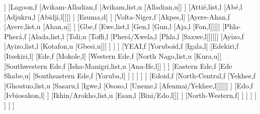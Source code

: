 \documentclass[landscape]{standalone}
\begin{document}
\begin{forest}
						[Agotime,l]
					]
					[Lagoon,f
						[Avikam-Alladian,f
							[Avikam,list,u
							[Alladian,u]]
						]
						[Attié,list,l
						[Abé,l
						[Adjukru,l
						[Abidji,l]]]]
					]
					[Esuma,d]
				]%
				[Volta-Niger,f
					[Akpes,l]
					[Ayere-Ahan,f
						[Ayere,list,u
						[Ahan,u]]
					]
					[Gbe,f
						[Ewe,list,l
						[Gen,l
						[Gun,l
						[Aja,l
						[Fon,l]]]]]
						[Phla-Pherá,f
							[Alada,list,l
							[Toli,u
							[Toffi,l
							[Pherá/Xwela,l
							[Phla,l
							[Saxwe,l]]]]]]
							[Ayizo,f
								[Ayizo,list,l
								[Kotafon,u
								[Gbesi,u]]]
							]
						]
					]%
					[YEAI,f
						[Yoruboid,f
							[Igala,l]
							[Edekiri,f
								[Itsekiri,l]
								[Ede,f
									[Mokole,l]
									[Western Ede,f
										[North Nago,list,u
										[Kura,u]]
										[Southwestern Ede,f
											[Isha-Manigri,list,u
											[Ana-Ife,l]]
										]%
									]%
									[Eastern Ede,f
										[Ede Shabe,u]
										[Southeastern Ede,f
											[Yoruba,l]
										]
									]%
								]%
							]%
						]%
						[Edoid,f
							[North-Central,f
								[Yekhee,f
									[Ghoutuo,list,u
									[Sasaru,l
									[Igwe,l
									[Ososo,l
									[Uneme,l
									[Afenmai/Yekhee,l]]]]]]
								]%
								[Edo,f
									[Ivbiosakon,l]
								]%
								[Ikhin/Arokho,list,u
								[Esan,l
								[Bini/Edo,l]]]
							]%
							[North-Western,f]%
						]%
					]%
				]%
			]%
		]%
	]%
]%
\end{forest}
\end{document}
